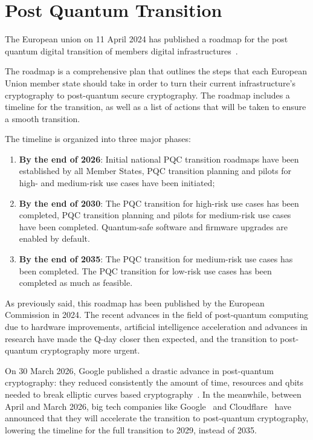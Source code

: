 \documentclass[binding=0.6cm,oneside,noexaminfo]{sapthesis}
\begin{document}
\section{Post Quantum Transition}
\label{PostQuantumTransition}
The European union on 11 April  2024 has published a roadmap for the
post quantum digital transition of members digital infrastructures~\cite{EuropeanCommission2024PQC}.

The roadmap is a comprehensive plan that outlines the steps that each European Union member state should take in order to turn
their current infrastructure's cryptography to post-quantum secure cryptography. 
The roadmap includes a timeline for the transition, as well as a list of actions that will be taken to ensure a smooth transition.

The timeline is organized into three major phases:

\begin{enumerate}
    \item \textbf{By the end of 2026}: Initial national PQC transition roadmaps have been established by all Member States, PQC transition planning 
    and pilots for high- and medium-risk use cases have been initiated;
    \item \textbf{By the end of 2030}: The PQC transition for high-risk use cases has been completed, PQC transition planning and pilots for medium-risk
     use cases have been completed. Quantum-safe software and ﬁrmware upgrades are enabled by default.
    \item \textbf{By the end of 2035}: The PQC transition for medium-risk use cases has been completed. The PQC transition for low-risk use cases has been completed as much as feasible.
\end{enumerate}

As previously said, this roadmap has been published by the European Commission in 2024. The recent advances in the field of post-quantum computing
due to hardware improvements, artificial intelligence acceleration and advances in research have made the Q-day closer then expected, and the transition to post-quantum cryptography 
more urgent. 

On 30 March 2026, Google published a drastic advance in post-quantum cryptography: they reduced consistently the amount of time, resources and qbits needed to break  
elliptic curves based cryptography~\cite{cryptoeprint:2026/625}. In the meanwhile, between April and March 2026, big tech companies like Google~\cite{Adkins2026Google} 
and Cloudflare~\cite{Westerbaan2026Cloudflare} have announced that they will accelerate the transition to post-quantum cryptography,
lowering the timeline for the full transition to 2029, instead of 2035.
\end{document}
